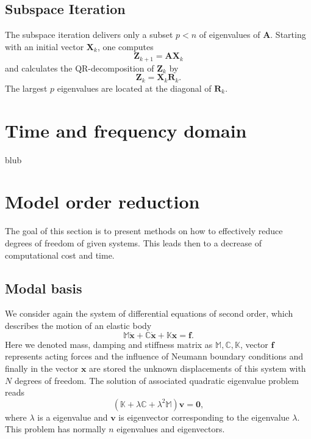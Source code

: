 \documentclass[conference]{journal}
\newcommand{\bb}[1]{\mathbb{#1}}
\newcommand{\B}[1]{\mathbf{#1}}
\newcommand{\Bx}{\B{x}}
\newcommand{\Bv}{\B{v}}
\begin{document}
	\subsection*{Subspace Iteration}
	The subspace iteration delivers only a subset $p<n$ of eigenvalues of $\textbf{A}$. Starting with an initial vector $\textbf{X}_k$, one computes
	\begin{equation}
	\textbf{Z}_{k+1}=\textbf{AX}_k
	\end{equation}
	and calculates the QR-decomposition of $\textbf{Z}_k$ by
	\begin{equation}
	\textbf{Z}_k=\textbf{X}_k\textbf{R}_k.
	\end{equation}
	The largest $p$ eigenvalues are located at the diagonal of $\textbf{R}_k$.
	
	
	
	\section{Time and frequency domain}
	blub
	
	
	\section{Model order reduction}
	The goal of this section is to present methods on how to effectively reduce degrees of freedom of given systems. This leads then to a decrease of computational cost and time.
	
	\subsection{Modal basis}
	We consider again the system of differential equations of second order, which describes the motion of an elastic body
	\begin{equation} \label{eq:3system}
	\bb{M} \ddot{\Bx} + \bb{C} \dot{\Bx} + \bb{K} \Bx = \B{f}.
	\end{equation}
	Here we denoted mass, damping and stiffness matrix as $\bb{M}, \bb{C}, \bb{K}$, vector $\B{f}$ represents acting forces and the influence of Neumann boundary conditions and finally in the vector $\Bx$ are stored the unknown displacements of this system with $N$ degrees of freedom. The solution of associated quadratic eigenvalue problem reads
	\begin{equation} \label{eq:3eigs}
	(\bb{K} + \lambda \bb{C} + \lambda^2 \bb{M}) \Bv = \B{0},
	\end{equation}
	where $\lambda$ is a eigenvalue and $\B{v}$ is eigenvector corresponding to the eigenvalue $\lambda$. This problem has normally $n$ eigenvalues and eigenvectors. 
	
\end{document}
